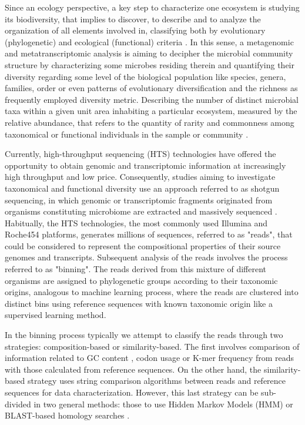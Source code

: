\documentclass[10pt,letterpaper]{article}
\begin{document}
Since an ecology perspective, a key step to characterize one ecosystem is studying its biodiversity, that implies to discover, to describe and to analyze the organization of all elements involved in, classifying both by evolutionary (phylogenetic) and ecological (functional) criteria \cite{Colwell:2009tr}. In this sense, a metagenomic and metatranscriptomic analysis is aiming to decipher the microbial community structure by characterizing some microbes residing therein and quantifying their diversity regarding some level of the biological population like species, genera, families, order or even patterns of evolutionary diversification and the richness as frequently employed diversity metric. Describing the number of distinct microbial taxa within a given unit area inhabiting a particular ecosystem, measured by the relative abundance, that refers to the quantity of rarity and commonness among taxonomical or functional individuals in the sample or community \cite{Colwell:2009tr,Mouillot:2004dq}.

Currently, high-throughput sequencing (HTS) technologies have offered the opportunity to obtain genomic and transcriptomic information at increasingly high throughput and low price. Consequently, studies aiming to investigate taxonomical and functional diversity use an approach referred to as shotgun sequencing, in which genomic or transcriptomic fragments originated from organisms constituting microbiome are extracted and massively sequenced \cite{Tyson:2004bw}. Habitually, the HTS technologies, the most commonly used Illumina and Roche454 platforms, generates millions of sequences, referred to as "reads", that could be considered to represent the compositional properties of their source genomes and transcripts. Subsequent analysis of the reads involves the process referred to as "binning". The reads derived from this mixture of different organisms are assigned to phylogenetic groups according to their taxonomic origins, analogous  to machine learning process, where the reads are clustered into distinct bins using reference sequences with known taxonomic origin like a supervised learning method.

In the binning process typically we attempt to classify the reads through two strategies: composition-based or similarity-based. The first involves comparison of information related to GC content \cite{Foerstner:2006uz}, codon usage \cite{Noguchi:2006tu} or K-mer frequency \cite{Sandberg:2001dw} from reads with those calculated from reference sequences. On the other hand, the similarity-based strategy uses string comparison algorithms between reads and reference sequences for data characterization. However, this last strategy can be sub-divided in two general methods: those to use Hidden Markov Models (HMM) \cite{Eddy:1998by} or BLAST-based homology searches \cite{Huson:2007jl,Haque:2009eh}.
\end{document}
